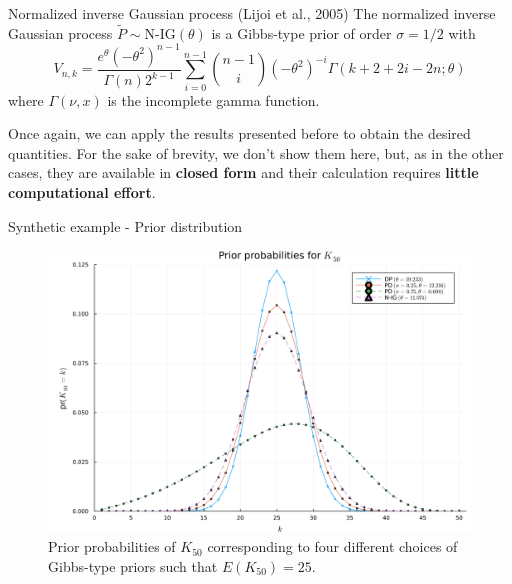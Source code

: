 \documentclass[11pt]{beamer}
\begin{document}
\begin{frame}{Normalized inverse Gaussian process (Lijoi et al., 2005)}
    The normalized inverse Gaussian process \(\tilde{P} \sim \text{N-IG}(\theta)\) is a Gibbs-type prior of order \(\sigma = 1/2\) with
    \begin{equation*}
        V_{n,k} = \frac{e^{\theta}(-\theta^2)^{n-1}}{\Gamma(n)2^{k-1}} \sum_{i=0}^{n-1}\binom{n-1}{i}(-\theta^2)^{-i}\Gamma(k+2+2i-2n; \theta)
    \end{equation*}
    where \(\Gamma(\nu, x)\) is the incomplete gamma function.
    \medskip
    
    Once again, we can apply the results presented before to obtain the desired quantities. For the sake of brevity, we don't show them here, but, as in the other cases, they are available in \textbf{closed form} and their calculation requires \textbf{little computational effort}.
\end{frame}

\begin{frame}{Synthetic example - Prior distribution}
    \begin{figure}
        \includegraphics[scale=0.1]{./img/prior_probability.png}
        \caption{Prior probabilities of \(K_{50}\) corresponding to four different choices of Gibbs-type priors such that \(E(K_{50}) = 25\).}
        \label{fig:prior}
    \end{figure}
\end{frame}
\end{document}
